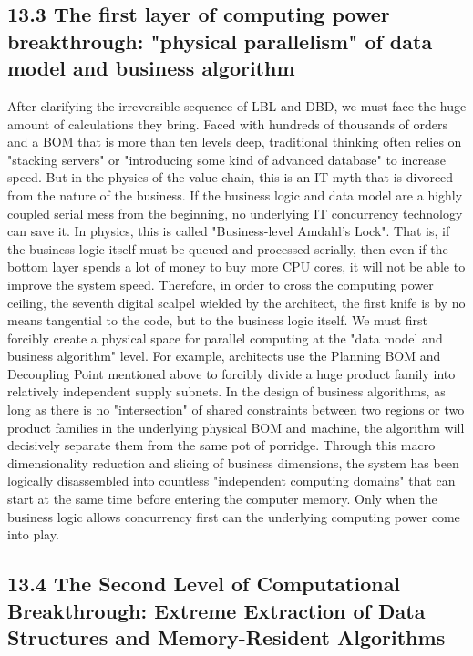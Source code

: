\documentclass[11pt,a4paper]{article}
\begin{document}
\subsection*{13.3 The first layer of computing power breakthrough: "physical parallelism" of data model and business algorithm}


After clarifying the irreversible sequence of LBL and DBD, we must face the huge amount of calculations they bring. Faced with hundreds of thousands of orders and a BOM that is more than ten levels deep, traditional thinking often relies on "stacking servers" or "introducing some kind of advanced database" to increase speed. But in the physics of the value chain, this is an IT myth that is divorced from the nature of the business. If the business logic and data model are a highly coupled serial mess from the beginning, no underlying IT concurrency technology can save it. In physics, this is called "Business-level Amdahl's Lock". That is, if the business logic itself must be queued and processed serially, then even if the bottom layer spends a lot of money to buy more CPU cores, it will not be able to improve the system speed. Therefore, in order to cross the computing power ceiling, the seventh digital scalpel wielded by the architect, the first knife is by no means tangential to the code, but to the business logic itself. We must first forcibly create a physical space for parallel computing at the "data model and business algorithm" level. For example, architects use the Planning BOM and Decoupling Point mentioned above to forcibly divide a huge product family into relatively independent supply subnets. In the design of business algorithms, as long as there is no "intersection" of shared constraints between two regions or two product families in the underlying physical BOM and machine, the algorithm will decisively separate them from the same pot of porridge. Through this macro dimensionality reduction and slicing of business dimensions, the system has been logically disassembled into countless "independent computing domains" that can start at the same time before entering the computer memory. Only when the business logic allows concurrency first can the underlying computing power come into play.


\subsection*{13.4 The Second Level of Computational Breakthrough: Extreme Extraction of Data Structures and Memory-Resident Algorithms}
\end{document}
